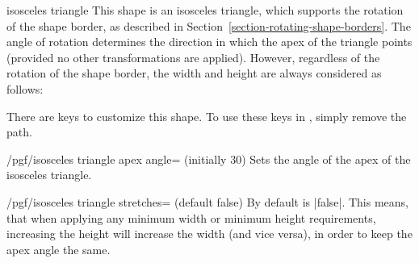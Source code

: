 \begin{shape}{isosceles triangle}
    This shape is an isosceles triangle, which supports the rotation of the
    shape border, as described in Section~\ref{section-rotating-shape-borders}.
    The angle of rotation determines the direction in which the apex of the
    triangle points (provided no other transformations are applied). However,
    regardless of the rotation of the shape border, the width and height are
    always considered as follows:
\begin{codeexample}[preamble={\usetikzlibrary{shapes.geometric}}]
\end{codeexample}

    There are \pgfname{} keys to customize this shape. To use these keys in
    \tikzname, simply remove the  path.

    \begin{key}{/pgf/isosceles triangle apex angle= (initially 30)}
        Sets the angle of the apex of the isosceles triangle.
    \end{key}

    \begin{key}{/pgf/isosceles triangle stretches= (default false)}
        By default  is |false|. This means, that when applying
        any minimum width or minimum height requirements, increasing the height
        will increase the width (and vice versa), in order to keep the apex
        angle the same.
\begin{codeexample}[preamble={\usetikzlibrary{shapes.geometric}}]
\end{codeexample}


\end{key}
\end{shape}
